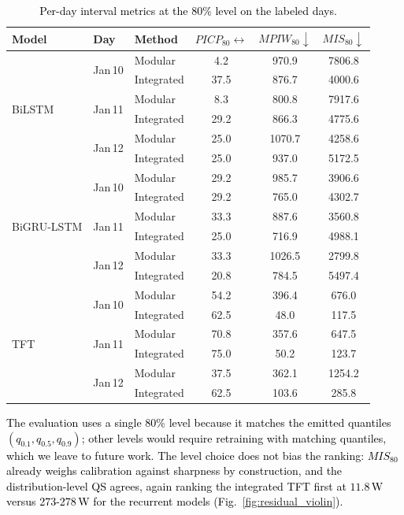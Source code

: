 \documentclass[final,10pt,1p,authoryear]{elsarticle}
\theoremstyle{definition}
\begin{document}
\begin{table}[!htbp]
\centering
\caption{\textcolor{black}{Per-day interval metrics at the 80\% level on the labeled days.}}
\label{tab:perday_interval}
\begin{tabular}{lllccc}
\toprule
Model & Day & Method & ${PICP}_{80}\leftrightarrow$ & ${MPIW}_{80}\downarrow$ & ${MIS}_{80}\downarrow$ \\
\midrule
\multirow{6}{*}{BiLSTM}
 & \multirow{2}{*}{Jan\,10} & Modular & 4.2 & 970.9 & 7806.8 \\
 & & Integrated & 37.5 & 876.7 & 4000.6 \\
\cmidrule{2-6}
 & \multirow{2}{*}{Jan\,11} & Modular & 8.3 & 800.8 & 7917.6 \\
 & & Integrated & 29.2 & 866.3 & 4775.6 \\
\cmidrule{2-6}
 & \multirow{2}{*}{Jan\,12} & Modular & 25.0 & 1070.7 & 4258.6 \\
 & & Integrated & 25.0 & 937.0 & 5172.5 \\
\midrule
\multirow{6}{*}{BiGRU-LSTM}
 & \multirow{2}{*}{Jan\,10} & Modular & 29.2 & 985.7 & 3906.6 \\
 & & Integrated & 29.2 & 765.0 & 4302.7 \\
\cmidrule{2-6}
 & \multirow{2}{*}{Jan\,11} & Modular & 33.3 & 887.6 & 3560.8 \\
 & & Integrated & 25.0 & 716.9 & 4988.1 \\
\cmidrule{2-6}
 & \multirow{2}{*}{Jan\,12} & Modular & 33.3 & 1026.5 & 2799.8 \\
 & & Integrated & 20.8 & 784.5 & 5497.4 \\
\midrule
\multirow{6}{*}{TFT}
 & \multirow{2}{*}{Jan\,10} & Modular & 54.2 & 396.4 & 676.0 \\
 & & Integrated & 62.5 & 48.0 & 117.5 \\
\cmidrule{2-6}
 & \multirow{2}{*}{Jan\,11} & Modular & 70.8 & 357.6 & 647.5 \\
 & & Integrated & 75.0 & 50.2 & 123.7 \\
\cmidrule{2-6}
 & \multirow{2}{*}{Jan\,12} & Modular & 37.5 & 362.1 & 1254.2 \\
 & & Integrated & 62.5 & 103.6 & 285.8 \\
\bottomrule
\end{tabular}
\end{table}
\textcolor{black}{The evaluation uses a single 80\% level because it matches the emitted quantiles $(q_{0.1},q_{0.5},q_{0.9})$; other levels would require retraining with matching quantiles, which we leave to future work. The level choice does not bias the ranking: ${MIS}_{80}$ already weighs calibration against sharpness by construction, and the distribution-level QS agrees, again ranking the integrated TFT first at $11.8$\,W versus 273-278\,W for the recurrent models (Fig.~\ref{fig:residual_violin}).}
\end{document}
